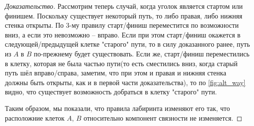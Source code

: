\documentclass[12pt]{article}
\begin{document}
\begin{proof}[Доказательство]
	Рассмотрим теперь случай, когда уголок является стартом или финишем. Поскольку существует некоторый путь, то либо правая, либо нижняя стенка открыты. По 3-му правилу старт/финиш переместится по возможности вниз, а если это невозможно -- вправо. Если при этом старт/финиш окажется в следующей/предыдущей клетке "старого" пути, то в силу доказанного ранее, путь из $A$ в $B$ по-прежнему будет существовать. Если же, старт/финиш переместились в клетку, которая не была частью пути(то есть сместились вниз, когда старый путь шёл вправо/справа, заметим, что при этом и правая и нижняя стенка должны быть открыты, как и в первой части доказательства), то по \ref{fig:alt_way}  видно, что существует возможность добраться в клетку "старого" пути.
	
	\bigskip
	
	Таким образом, мы показали, что правила лабиринта изменяют его так, что расположние клеток $A$, $B$ относительно компонент связности не изменяется.
\end{proof}
\end{document}
